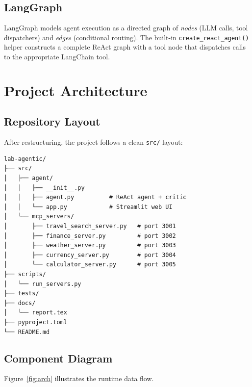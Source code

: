 \documentclass[12pt,a4paper]{article}
\begin{document}
\subsection{LangGraph}

LangGraph models agent execution as a directed graph of \emph{nodes}
(LLM calls, tool dispatchers) and \emph{edges} (conditional routing).
The built-in \texttt{create\_react\_agent()} helper constructs a complete
ReAct graph with a tool node that dispatches calls to the appropriate
LangChain tool.

\section{Project Architecture}

\subsection{Repository Layout}

After restructuring, the project follows a clean \texttt{src/} layout:

\begin{verbatim}
lab-agentic/
├── src/
│   ├── agent/
│   │   ├── __init__.py
│   │   ├── agent.py          # ReAct agent + critic
│   │   └── app.py            # Streamlit web UI
│   └── mcp_servers/
│       ├── travel_search_server.py   # port 3001
│       ├── finance_server.py         # port 3002
│       ├── weather_server.py         # port 3003
│       ├── currency_server.py        # port 3004
│       └── calculator_server.py      # port 3005
├── scripts/
│   └── run_servers.py
├── tests/
├── docs/
│   └── report.tex
├── pyproject.toml
└── README.md
\end{verbatim}

\subsection{Component Diagram}

Figure~\ref{fig:arch} illustrates the runtime data flow.
\end{document}

